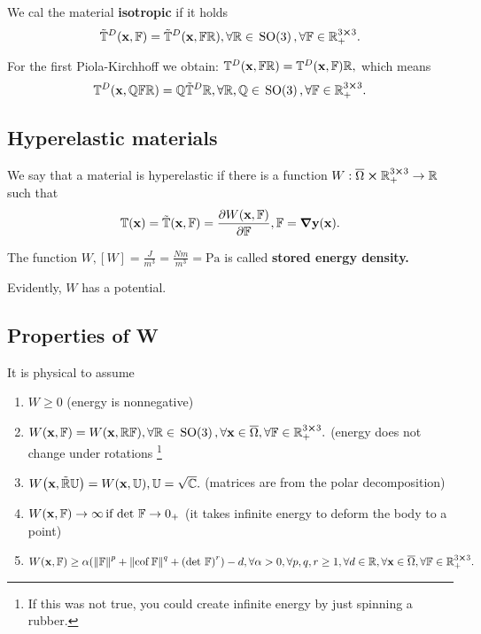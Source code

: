 \documentclass[reqno, a4paper]{article}
\begin{document}
\begin{definition}
	We cal the material \textbf{isotropic} if it holds
	\[
		\tilde{\mathbb{T}}^D\qty(\vb{x},\mathbb{F}) = \tilde{\mathbb{T}}^D\qty(\vb{x},\mathbb{F} \mathbb{R}), \forall \mathbb{R} \in \, \text{SO(3)} \,, \forall \mathbb{F} \in {\mathbb R}^{3 \cross 3}_+.
	\]
\end{definition}
\begin{remark}
	For the first Piola-Kirchhoff we obtain: $\mathbb{T}^D\qty(\vb{x},\mathbb{F} \mathbb{R}) = \mathbb{T}^D\qty(\vb{x},\mathbb{F}) \mathbb{R}, $ which means
	\[
		\mathbb{T}^D\qty(\vb{x}, \mathbb{Q}\mathbb{F} \mathbb{R}) = \mathbb{Q}\tilde{\mathbb{T}}^D \mathbb{R}, \forall \mathbb{R}, \mathbb{Q} \in \, \text{SO(3)} \,, \forall \mathbb{F} \in {\mathbb R}^{3 \cross 3}_+.
	\]
\end{remark}

\subsection{Hyperelastic materials}
\label{sec:hyperelasticity}
\begin{definition}
	We say that a material is hyperelastic if there is a function $W:\overline{\Omega} \cross {\mathbb R}^{3 \cross 3}_+ \to {\mathbb R}$ such that
	\[
		\mathbb{T}\qty(\vb{x}) = \tilde{\mathbb{T}}\qty(\vb{x}, \mathbb{F}) = \pdv{W\qty(\vb{x},\ensuremath{\mathbb{F}})}{\ensuremath{\mathbb{F}}}, \mathbb{F} = \grad \vb{y}(\vb{x}).
	\]

The function $W, [W] = \frac{J}{m^3} = \frac{N m}{m^3} = \text{Pa}$ is called \textbf{stored energy density.}
\end{definition}
	
\begin{remark}
    Evidently, $W$ has a potential.
\end{remark}

\subsection{Properties of W}
\label{sec:propetiesW}
It is physical to assume
\begin{enumerate}
	\item $W\geq 0$ (energy is nonnegative)
	\item $W\qty(\vb{x},\mathbb{F}) = W\qty(\vb{x},\mathbb{R} \mathbb{F}), \forall \mathbb{R} \in \, \text{SO(3)} \,, \forall \vb{x} \in \overline{\Omega}, \forall \mathbb{F} \in {\mathbb R}^{3 \cross 3}_+.$ (energy does not change under rotations \footnote{If this was not true, you could create infinite energy by just spinning a rubber.}
	\item $W\qty(\vb{x}, \tilde{\mathbb{R}} \mathbb{U}) = W\qty(\vb{x}, \mathbb{U}), \mathbb{U}=\sqrt{\mathbb{C}}.$ (matrices are from the polar decomposition)
	\item $W\qty(\vb{x},\mathbb{F}) \to \infty \, \text{if} \, \det\, \mathbb{F} \to 0_+$ (it takes infinite energy to deform the body to a point)
	\item $W\qty(\vb{x},\mathbb{F}) \geq \alpha\qty(\norm{\mathbb{F}}^p + \norm{\operatorname{cof} \mathbb{F}}^q + \qty(\det\, \mathbb{F})^r)-d, \forall \alpha > 0, \forall p,q,r \geq 1, \forall d \in {\mathbb R}, \forall \vb{x} \in \overline{\Omega}, \forall \mathbb{F} \in {\mathbb R}^{3 \cross 3}_+.$
\end{enumerate}
\end{document}
